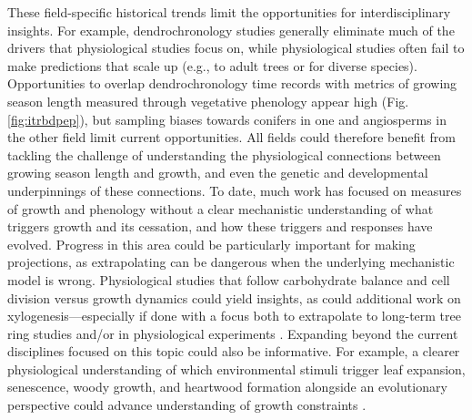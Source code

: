 \documentclass[11pt]{article}
\begin{document}
These field-specific historical trends limit the opportunities for interdisciplinary insights. For example, dendrochronology studies generally eliminate much of the drivers that physiological studies focus on, while physiological studies often fail to make predictions that scale up (e.g., to adult trees or for diverse species). Opportunities to overlap dendrochronology time records with metrics of growing season length measured through vegetative phenology appear high (Fig. \ref{fig:itrbdpep}), but sampling biases towards conifers in one and angiosperms in the other field limit current opportunities. All fields could therefore benefit from tackling the challenge of understanding the physiological connections between growing season length and growth, and even the genetic and developmental underpinnings of these connections. To date, much work has focused on measures of growth and phenology without a clear mechanistic understanding of what triggers growth and its cessation, and how these triggers and responses have evolved.  %
Progress in this area could be particularly important for making projections, as extrapolating can be dangerous when the underlying mechanistic model is wrong. Physiological studies that follow carbohydrate balance and cell division \citep[see][]{locosselli2017dendrobiochemistry} versus growth dynamics could yield insights, as could additional work on xylogenesis---especially if done with a focus both to extrapolate to long-term tree ring studies and/or in physiological experiments \citep{fang2020physiological,simard2013intra}. Expanding beyond the current disciplines focused on this topic could also be informative. For example, a clearer physiological understanding of which environmental stimuli trigger leaf expansion, senescence, woody growth, and heartwood formation alongside an evolutionary perspective could advance understanding of growth
constraints \citep{baas2011wood,eckert2019makes,ensminger2015tree,juvany2013photo}.

\end{document}

